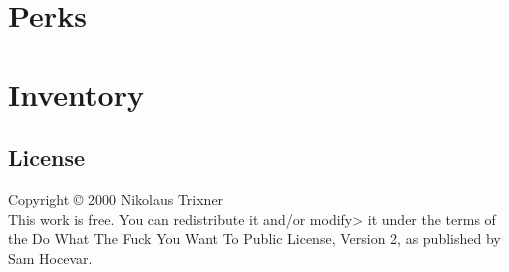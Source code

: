 \documentclass[a4paper]{book}
\begin{document}
    \part{Perks}\label{part:perks}
    
    
    
    
    
    
    

    \part{Inventory}\label{part:inventory}
    
    
    
    

    \begin{appendices}
        
        
        

        \chapter{License}\label{chapter:license}
        Copyright © 2000 Nikolaus Trixner\\
        This work is free.
        You can redistribute it and/or modify> it under the terms of the Do What The Fuck You Want To Public License, Version 2, as published by Sam Hocevar.
    \end{appendices}
\end{document}
